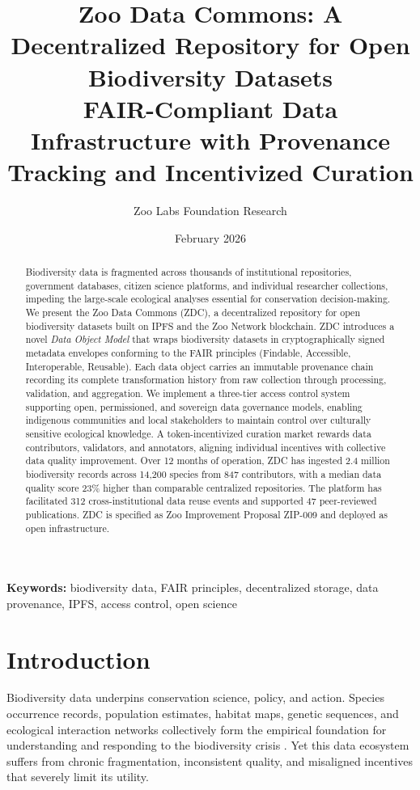 \documentclass[11pt,a4paper]{article}
\title{\textbf{Zoo Data Commons: A Decentralized Repository for Open Biodiversity Datasets} \\[0.5em]
\large FAIR-Compliant Data Infrastructure with Provenance Tracking and Incentivized Curation}
\author[1]{Zoo Labs Foundation Research}
\affil[1]{Zoo Labs Foundation, Research Division \\ \texttt{research@zoo.ngo}}
\date{February 2026}
\begin{document}
\zoocoverpage

\begin{abstract}
\noindent
Biodiversity data is fragmented across thousands of institutional repositories, government databases, citizen science platforms, and individual researcher collections, impeding the large-scale ecological analyses essential for conservation decision-making.
We present the Zoo Data Commons (ZDC), a decentralized repository for open biodiversity datasets built on IPFS and the Zoo Network blockchain.
ZDC introduces a novel \emph{Data Object Model} that wraps biodiversity datasets in cryptographically signed metadata envelopes conforming to the FAIR principles (Findable, Accessible, Interoperable, Reusable).
Each data object carries an immutable provenance chain recording its complete transformation history from raw collection through processing, validation, and aggregation.
We implement a three-tier access control system supporting open, permissioned, and sovereign data governance models, enabling indigenous communities and local stakeholders to maintain control over culturally sensitive ecological knowledge.
A token-incentivized curation market rewards data contributors, validators, and annotators, aligning individual incentives with collective data quality improvement.
Over 12 months of operation, ZDC has ingested 2.4 million biodiversity records across 14,200 species from 847 contributors, with a median data quality score 23\% higher than comparable centralized repositories.
The platform has facilitated 312 cross-institutional data reuse events and supported 47 peer-reviewed publications.
ZDC is specified as Zoo Improvement Proposal ZIP-009 and deployed as open infrastructure.
\end{abstract}

\vspace{0.5em}
\noindent\textbf{Keywords:} biodiversity data, FAIR principles, decentralized storage, data provenance, IPFS, access control, open science

\section{Introduction}
\label{sec:introduction}

Biodiversity data underpins conservation science, policy, and action.
Species occurrence records, population estimates, habitat maps, genetic sequences, and ecological interaction networks collectively form the empirical foundation for understanding and responding to the biodiversity crisis \citep{diaz2019global}.
Yet this data ecosystem suffers from chronic fragmentation, inconsistent quality, and misaligned incentives that severely limit its utility.
\end{document}
